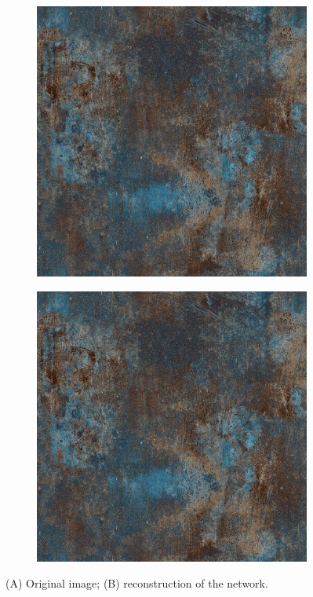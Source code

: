 \begin{figure}[!ht]
    \centering
      \begin{subfigure}{0.40\textwidth}
        \includegraphics[width=\linewidth]{img/ch6/dirty/gt6.png}
        \caption{}
      \end{subfigure}
      \begin{subfigure}{0.40\textwidth}
        \includegraphics[width=\linewidth]{img/ch6/dirty/detail6.png}
        \caption{}
      \end{subfigure}
      \caption{(A) Original image; (B) reconstruction of the network.}
      \label{f:rec_gt}
\end{figure}

